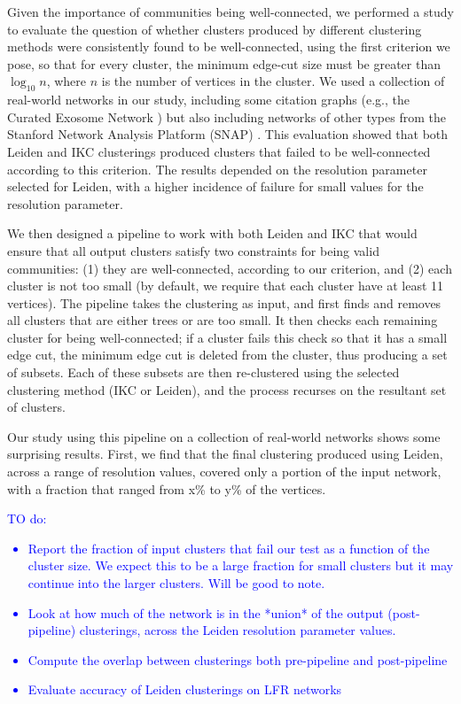 \documentclass[12pt, oneside]{article}   	%
\begin{document}
Given the importance of communities being well-connected, we performed a study to evaluate the question of whether clusters produced by different clustering methods
were consistently found to be well-connected, using the first criterion we pose, so that for every cluster, the minimum edge-cut size must be greater than $\log_{10}n$, where $n$ is the number of vertices in the cluster. 
We used a collection of real-world networks in our study, including some citation graphs (e.g., the Curated Exosome Network \citep{Wedell2022})  but also including networks of other types from the Stanford Network Analysis Platform (SNAP) \citep{leskovec2016snap}.
This evaluation showed that both Leiden and IKC clusterings produced clusters that failed to be well-connected according to this criterion.
The results depended on the resolution parameter selected for Leiden,  with a higher incidence of failure for small values for the resolution parameter.

We then designed a pipeline to work with both Leiden and IKC that would ensure that all output clusters satisfy two constraints for being valid communities: (1) they are well-connected, according to our criterion, and (2) each cluster is not too small (by default, we require that each cluster have at least 11 vertices).
The pipeline takes the clustering as input, and first finds and removes all clusters that are either trees or are too small.  It then checks each remaining cluster for being well-connected; if a cluster
fails this check so that it has a small edge cut, the minimum edge cut is deleted from the cluster, thus producing a set of subsets.  Each of these subsets are then re-clustered using the selected clustering
method (IKC or Leiden), and the process recurses on the resultant set of clusters.

Our study using this pipeline on a collection of real-world networks shows some surprising results.
First, we find that the final clustering produced using Leiden, across a range of resolution values, 
covered only a portion of the input network, with a  fraction that ranged from x\% to y\% of the vertices.

\textcolor{blue}{TO do:
\begin{itemize}
\item Report the fraction of input clusters that fail our test as a function of the cluster size.
We expect this to be a large fraction for small clusters but it may continue into the larger clusters.
Will be good to note.
\item Look at how much of the network is in the *union* of the output (post-pipeline) clusterings, across the Leiden resolution parameter values.
\item Compute the overlap between clusterings both pre-pipeline and post-pipeline
\item  Evaluate accuracy of Leiden clusterings on LFR networks 
\end{itemize}
}
\end{document}
